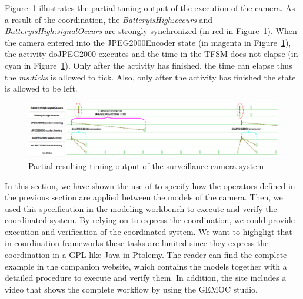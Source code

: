 Figure~\ref{fig:camerasystem} illustrates the partial timing output of the execution of the camera. As a result of the coordination, the \mse \emph{BatteryisHigh:occurs} and \emph{BatteryisHigh:signalOccurs} are strongly synchronized (in red in Figure~\ref{fig:camerasystem}). When the camera entered into the JPEG2000Encoder state (in magenta in Figure~\ref{fig:camerasystem}), the activity doJPEG2000 executes and the time in the TFSM does not elapse (in cyan in Figure~\ref{fig:camerasystem}). Only after the activity has finished, the time can elapse thus the \mse \emph{ms:ticks} is allowed to tick. Also, only after the activity has finished the state is allowed to be left. %
	
		\begin{figure}[h]
			\center
			\includegraphics[width=1\columnwidth]{examples/figs/vcdcamera}
			\caption{Partial resulting timing output of the surveillance camera system}
			\label{fig:camerasystem}
		\end{figure}
	
In this section, we have shown the use of \bflow to specify how the operators defined in the previous section are applied between the models of the camera. Then, we used this specification in the modeling workbench to execute and verify the coordinated system. By relying on \ccsl to express the coordination, we could provide execution and verification of the coordinated system. We want to highgligt that in coordination frameworks these tasks are limited since they express the coordination in a GPL like Java in Ptolemy. The reader can find the complete example in the companion website, which contains the models together with a detailed procedure to execute and verify them. In addition, the site includes a video that shows the complete workflow by using the GEMOC studio.


